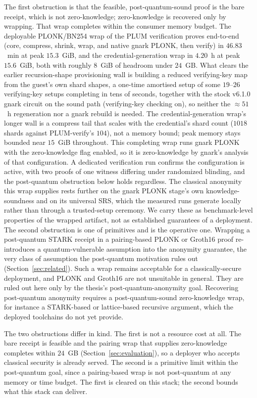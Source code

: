 The first obstruction is that the feasible, post-quantum-sound proof is the bare receipt, which is not zero-knowledge; zero-knowledge is recovered only by wrapping. That wrap completes within the consumer memory budget. The deployable PLONK/BN254 wrap of the PLUM verification proves end-to-end (core, compress, shrink, wrap, and native gnark PLONK, then verify) in $46.83$~min at peak $15.3$~GiB, and the credential-generation wrap in $4.20$~h at peak $15.6$~GiB, both with roughly $8$~GiB of headroom under $24$~GB. What clears the earlier recursion-shape provisioning wall is building a reduced verifying-key map from the guest's own shard shapes, a one-time amortised setup of some $19$--$26$ verifying-key setups completing in tens of seconds, together with the stock v6.1.0 gnark circuit on the sound path (verifying-key checking on), so neither the ${\approx}51$~h regeneration nor a gnark rebuild is needed. The credential-generation wrap's longer wall is a compress tail that scales with the credential's shard count ($1018$ shards against PLUM-verify's $104$), not a memory bound; peak memory stays bounded near $15$~GiB throughout. This completing wrap runs gnark PLONK with the zero-knowledge flag enabled, so it is zero-knowledge by gnark's analysis of that configuration. A dedicated verification run confirms the configuration is active, with two proofs of one witness differing under randomized blinding, and the post-quantum obstruction below holds regardless. The classical anonymity this wrap supplies rests further on the gnark PLONK stage's own knowledge-soundness and on its universal SRS, which the measured runs generate locally rather than through a trusted-setup ceremony. We carry these as benchmark-level properties of the wrapped artifact, not as established guarantees of a deployment. The second obstruction is one of primitives and is the operative one. Wrapping a post-quantum STARK receipt in a pairing-based PLONK or Groth16 proof re-introduces a quantum-vulnerable assumption into the anonymity guarantee, the very class of assumption the post-quantum motivation rules out (Section~\ref{sec:related}). Such a wrap remains acceptable for a classically-secure deployment, and PLONK and Groth16 are not unsuitable in general. They are ruled out here only by the thesis's post-quantum-anonymity goal. Recovering post-quantum anonymity requires a post-quantum-sound zero-knowledge wrap, for instance a STARK-based or lattice-based recursive argument, which the deployed toolchains do not yet provide.

The two obstructions differ in kind. The first is not a resource cost at all. The bare receipt is feasible and the pairing wrap that supplies zero-knowledge completes within $24$~GB (Section~\ref{sec:evaluation}), so a deployer who accepts classical security is already served. The second is a primitive limit within the post-quantum goal, since a pairing-based wrap is not post-quantum at any memory or time budget. The first is cleared on this stack; the second bounds what this stack can deliver.

